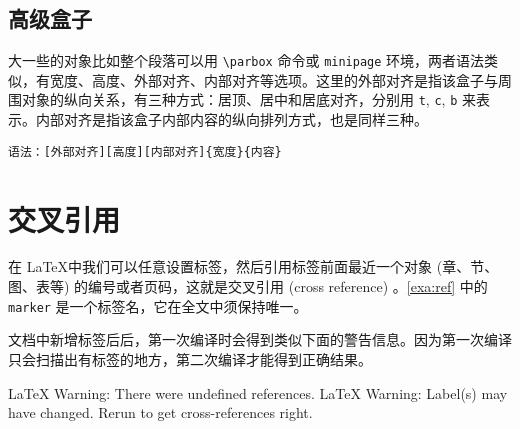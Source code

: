 \begin{example}[h]
\caption{ \texttt{makebox}和 \texttt{framebox}}
\label{exa:makebox}
\end{example}

\subsection{高级盒子}

大一些的对象比如整个段落可以用 \verb|\parbox| 命令或 \texttt{minipage} 环境，两者语法类似，有宽度、高度、外部对齐、内部对齐等选项。这里的外部对齐是指该盒子与周围对象的纵向关系，有三种方式：居顶、居中和居底对齐，分别用 \texttt{t}, \texttt{c}, \texttt{b} 来表示。内部对齐是指该盒子内部内容的纵向排列方式，也是同样三种。

\verb|语法：[外部对齐][高度][内部对齐]{宽度}{内容}|

\begin{example}[h]

\caption{\texttt{parbox} 和 \texttt{minipage}}
\label{exa:parbox}
\end{example}


\section{交叉引用}
\label{sec:crossref}

在 \LaTeX 中我们可以任意设置标签，然后引用标签前面最近一个对象 (章、节、图、表等) 的编号或者页码，这就是交叉引用 (cross reference) 。\autoref{exa:ref} 中的 \texttt{marker} 是一个标签名，它在全文中须保持唯一。

\begin{example}[h]
\caption{交叉引用}
\label{exa:ref}
\end{example}

文档中新增标签后后，第一次编译时会得到类似下面的警告信息。因为第一次编译只会扫描出有标签的地方，第二次编译才能得到正确结果。

\begin{Code}[]
LaTeX Warning: There were undefined references.
LaTeX Warning: Label(s) may have changed. Rerun to get cross-references right.
\end{Code}



